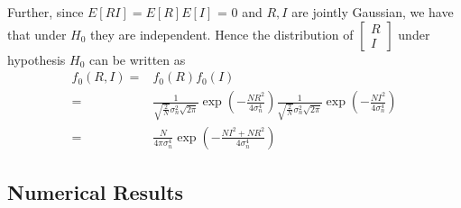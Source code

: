 Further, since $E[RI] = E[R]E[I]$ = 0 and $R, I$ are jointly Gaussian, we have that under $H_0$ they are independent. Hence the distribution of $\begin{bmatrix}
  R \\
  I
\end{bmatrix}$ under hypothesis $H_0$ can be written as
\begin{equation}
  \begin{split}
	f_0(R, I)= &f_0(R)f_0(I)\\
	= &\frac{1}{\sqrt{\frac{2}{N}}\sigma_n^2\sqrt{2\pi}}\exp\left( -\frac{NR^2}{4\sigma_n^4} \right)\frac{1}{\sqrt{\frac{2}{N}}\sigma_n^2\sqrt{2\pi}}\exp\left( -\frac{NI^2}{4\sigma_n^4} \right)\\
	=&\frac{N}{4\pi \sigma_n^4}\exp\left( -\frac{NI^2+NR^2}{4\sigma_n^4} \right) 
  \end{split}
  \label{f0R0}
\end{equation}
\subsection{Numerical Results}

